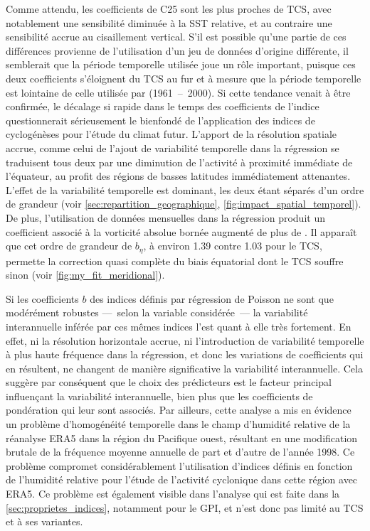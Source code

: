 \documentclass[../main.tex]{subfiles}
\begin{document}
Comme attendu, les coefficients de C25 sont les plus proches de TCS, avec notablement une sensibilité diminuée à la SST relative, et au contraire une
sensibilité accrue au cisaillement vertical. S'il est possible qu'une partie de ces différences provienne de l'utilisation d'un jeu de données d'origine
différente, il semblerait que la période temporelle utilisée joue un rôle important, puisque ces deux coefficients s'éloignent du TCS au fur et à mesure que la
période temporelle est lointaine de celle utilisée par \textcite{tippett_poisson_2011} (\num{1961}~--~\num{2000}). Si cette tendance venait à être confirmée, le
décalage si rapide dans le temps des coefficients de l'indice questionnerait sérieusement le bienfondé de l'application des indices de cyclogénèses pour l'étude
du climat futur. L'apport de la résolution spatiale accrue, comme celui de l'ajout de variabilité temporelle dans la régression se traduisent tous deux par une
diminution de l'activité à proximité immédiate de l'équateur, au profit des régions de basses latitudes immédiatement attenantes. L'effet de la variabilité
temporelle est dominant, les deux étant séparés d'un ordre de grandeur (voir \cref{sec:repartition_geographique}, \cref{fig:impact_spatial_temporel}). De plus,
l'utilisation de données mensuelles dans la régression produit un coefficient associé à la vorticité absolue bornée augmenté de plus de . Il apparaît
que cet ordre de grandeur de $b_\eta$, à environ \num{1.39} contre \num{1.03} pour le TCS, permette la correction quasi complète du biais équatorial dont le TCS
souffre sinon (voir \cref{fig:my_fit_meridional}).

Si les coefficients $b$ des indices définis par régression de Poisson ne sont que modérément robustes ---~selon la variable considérée~--- la variabilité
interannuelle inférée par ces mêmes indices l'est quant à elle très fortement. En effet, ni la résolution horizontale accrue, ni l'introduction de variabilité
temporelle à plus haute fréquence dans la régression, et donc les variations de coefficients qui en résultent, ne changent de manière significative la
variabilité interannuelle. Cela suggère par conséquent que le choix des prédicteurs est le facteur principal influençant la variabilité interannuelle, bien plus
que les coefficients de pondération qui leur sont associés. Par ailleurs, cette analyse a mis en évidence un problème d'homogénéité temporelle dans le champ
d'humidité relative de la réanalyse ERA5 dans la région du Pacifique ouest, résultant en une modification brutale de la fréquence moyenne annuelle de part et
d'autre de l'année \num{1998}. Ce problème compromet considérablement l'utilisation d'indices définis en fonction de l'humidité relative pour l'étude de
l'activité cyclonique dans cette région avec ERA5. Ce problème est également visible dans l'analyse qui est faite dans la \cref{sec:proprietes_indices},
notamment pour le GPI, et n'est donc pas limité au TCS et à ses variantes.
\end{document}
